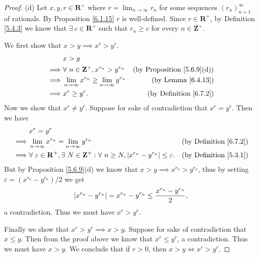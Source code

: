 \begin{proof}{(d)}
    Let \(x, y, r \in \mathbf{R}^+\) where \(r = \lim_{n \to \infty} r_n\) for some sequences \((r_n)_{n = 1}^\infty\) of rationals.
    By Proposition \ref{6.1.15} \(r\) is well-defined.
    Since \(r \in \mathbf{R}^+\), by Definition \ref{5.4.3} we know that \(\exists\ c \in \mathbf{R}^+\) such that \(r_n \geq c\) for every \(n \in \mathbf{Z}^+\).

    We first show that \(x > y \implies x^r > y^r\).
    \begin{align*}
                 & x > y                                                                                                 \\
        \implies & \forall\ n \in \mathbf{Z}^+, x^{r_n} > y^{r_n}               & \text{(by Proposition \ref{5.6.9}(d))} \\
        \implies & \lim_{n \to \infty} x^{r_n} \geq \lim_{n \to \infty} y^{r_n} & \text{(by Lemma \ref{6.4.13})}         \\
        \implies & x^r \geq y^r.                                                & \text{(by Definition \ref{6.7.2})}
    \end{align*}
    Now we show that \(x^r \neq y^r\).
    Suppose for sake of contradiction that \(x^r = y^r\).
    Then we have
    \begin{align*}
                 & x^r = y^r                                                                                                                                                               \\
        \implies & \lim_{n \to \infty} x^{r_n} = \lim_{n \to \infty} y^{r_n}                                                                          & \text{(by Definition \ref{6.7.2})} \\
        \implies & \forall\ \varepsilon \in \mathbf{R}^+, \exists\ N \in \mathbf{Z}^+ : \forall\ n \geq N, \abs*{x^{r_n} - y^{r_n}} \leq \varepsilon. & \text{(by Definition \ref{5.3.1})}
    \end{align*}
    But by Proposition \ref{5.6.9}(d) we know that \(x > y \implies x^{r_n} > y^{r_n}\), thus by setting \(\varepsilon = (x^{r_n} - y^{r_n}) / 2\) we get
    \[
        \abs*{x^{r_n} - y^{r_n}} = x^{r_n} - y^{r_n} \leq \frac{x^{r_n} - y^{r_n}}{2},
    \]
    a contradiction.
    Thus we must have \(x^r > y^r\).

    Finally we show that \(x^r > y^r \implies x > y\).
    Suppose for sake of contradiction that \(x \leq y\).
    Then from the proof above we know that \(x^r \leq y^r\), a contradiction.
    Thus we must have \(x > y\).
    We conclude that if \(r > 0\), then \(x > y \iff x^r > y^r\).
\end{proof}

